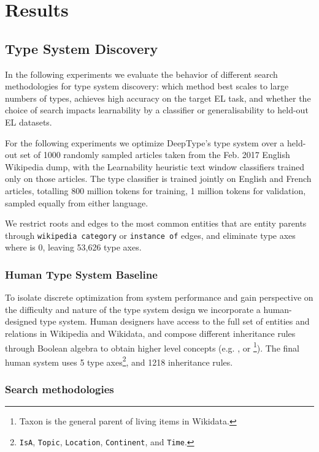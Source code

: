 \documentclass[letterpaper]{article}
\begin{document}
\section{Results}

\subsection{Type System Discovery}
In the following experiments we evaluate the behavior of different search methodologies for type system discovery: which method best scales to large numbers of types, achieves high accuracy on the target EL task, and whether the choice of search impacts learnability by a classifier or generalisability to held-out EL datasets.

For the following experiments we optimize DeepType's type system over a held-out set of 1000 randomly sampled articles taken from the Feb. 2017 English Wikipedia dump, with the Learnability heuristic text window classifiers trained only on those articles. The type classifier is trained jointly on English and French articles, totalling 800 million tokens for training, 1 million tokens for validation, sampled equally from either language.


We restrict roots  and edges  to the most common  entities that are entity parents through \texttt{wikipedia category} or \texttt{instance of} edges, and eliminate type axes where  is 0, leaving 53,626 type axes. 

\subsubsection{Human Type System Baseline}
\label{section:humandesign}
To isolate discrete optimization from system performance and gain perspective on the difficulty and nature of the type system design we incorporate a human-designed type system. Human designers have access to the full set of entities and relations in Wikipedia and Wikidata, and compose different inheritance rules through Boolean algebra to obtain higher level concepts (e.g. , or \footnote{Taxon is the general parent of living items in Wikidata.}). The final human system uses 5 type axes\footnote{\texttt{IsA}, \texttt{Topic}, \texttt{Location}, \texttt{Continent}, and \texttt{Time}.}, and 1218 inheritance rules.

\subsubsection{Search methodologies}
\end{document}
